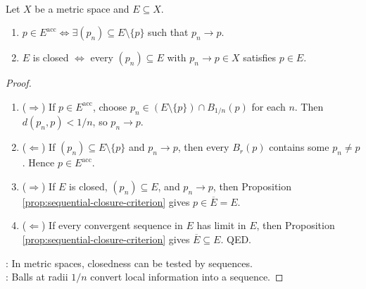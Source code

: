 \begin{theorem} \label{thm:closed-sets-and-limit-points-via-sequences} \\
Let $X$ be a metric space and $E\subseteq X$.
\begin{enumerate}[label=(\roman*)]
\setlength{\itemsep}{0pt}
\item $p\in E^{\operatorname{acc}}\Longleftrightarrow\exists(p_n)\subseteq E\setminus\{p\}$ such that $p_n\to p$.
\item $E$ is closed $\Longleftrightarrow$ every $(p_n)\subseteq E$ with $p_n\to p\in X$ satisfies $p\in E$.
\end{enumerate}
\begin{proof}
\begin{enumerate}[label=(\roman*).]
\setlength{\itemsep}{0pt}
\item[$(i)$]($\Rightarrow$) If $p\in E^{\operatorname{acc}}$, choose $p_n\in(E\setminus\{p\})\cap B_{1/n}(p)$ for each $n$. Then $d(p_n,p)<1/n$, so $p_n\to p$.
\item[$(i)$]($\Leftarrow$) If $(p_n)\subseteq E\setminus\{p\}$ and $p_n\to p$, then every $B_r(p)$ contains some $p_n\ne p$. Hence $p\in E^{\operatorname{acc}}$.
\item[$(ii)$]($\Rightarrow$) If $E$ is closed, $(p_n)\subseteq E$, and $p_n\to p$, then Proposition \ref{prop:sequential-closure-criterion} gives $p\in\overline{E}=E$.
\item[$(ii)$]($\Leftarrow$) If every convergent sequence in $E$ has limit in $E$, then Proposition \ref{prop:sequential-closure-criterion} gives $\overline{E}\subseteq E$. QED.
\end{enumerate}
: In metric spaces, closedness can be tested by sequences.\\
: Balls at radii $1/n$ convert local information into a sequence.
\end{proof}
\end{theorem}


